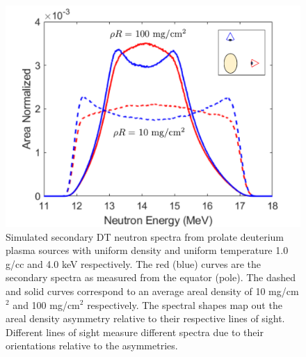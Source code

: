 	\begin{figure}[h!]
		\centering
		\includegraphics[scale=0.6]{Figures/secondaryDTAsym.pdf}
		\caption[Secondary DT neutron spectra from asymmetric plasmas]{ Simulated secondary DT neutron spectra from prolate deuterium plasma sources with uniform density and uniform temperature 1.0 g/cc and 4.0 keV respectively. The red (blue) curves are the secondary spectra as measured from the equator (pole). The dashed and solid curves correspond to an average areal density of 10 mg/cm$^2$ and 100 mg/cm$^2$ respectively. The spectral shapes map out the areal density asymmetry relative to their respective lines of sight. Different lines of sight measure different spectra due to their orientations relative to the asymmetries.    }
		\label{secondaryDTAsym}
	\end{figure}



